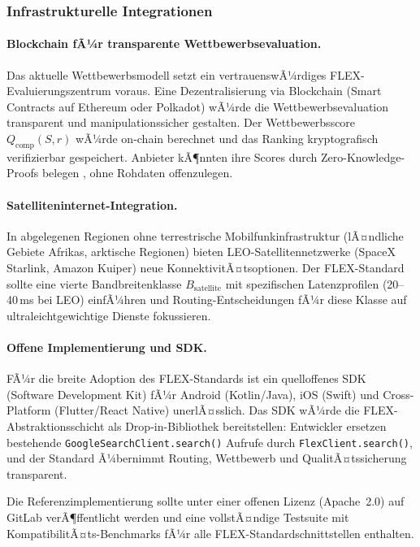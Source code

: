 ﻿\documentclass[a4paper,12pt]{article}
\theoremstyle{definition}
\begin{document}
\subsubsection{Infrastrukturelle Integrationen}

\paragraph{Blockchain fÃ¼r transparente Wettbewerbsevaluation.}
Das aktuelle Wettbewerbsmodell setzt ein vertrauenswÃ¼rdiges FLEX-Evaluierungszentrum voraus. Eine Dezentralisierung via Blockchain (Smart Contracts auf Ethereum oder Polkadot) wÃ¼rde die Wettbewerbsevaluation transparent und manipulationssicher gestalten. Der Wettbewerbsscore $Q_\mathrm{comp}(S, r)$ wÃ¼rde on-chain berechnet und das Ranking kryptografisch verifizierbar gespeichert. Anbieter kÃ¶nnten ihre Scores durch Zero-Knowledge-Proofs belegen \cite{boneh2023}, ohne Rohdaten offenzulegen.

\paragraph{Satelliteninternet-Integration.}
In abgelegenen Regionen ohne terrestrische Mobilfunkinfrastruktur (lÃ¤ndliche Gebiete Afrikas, arktische Regionen) bieten LEO-Satellitennetzwerke (SpaceX Starlink, Amazon Kuiper) neue KonnektivitÃ¤tsoptionen. Der FLEX-Standard sollte eine vierte Bandbreitenklasse $B_\mathrm{satellite}$ mit spezifischen Latenzprofilen (20--40\,ms bei LEO) einfÃ¼hren und Routing-Entscheidungen fÃ¼r diese Klasse auf ultraleichtgewichtige Dienste fokussieren.

\paragraph{Offene Implementierung und SDK.}
FÃ¼r die breite Adoption des FLEX-Standards ist ein quelloffenes SDK (Software Development Kit) fÃ¼r Android (Kotlin/Java), iOS (Swift) und Cross-Platform (Flutter/React Native) unerlÃ¤sslich. Das SDK wÃ¼rde die FLEX-Abstraktionsschicht als Drop-in-Bibliothek bereitstellen: Entwickler ersetzen bestehende \texttt{GoogleSearchClient.search()} Aufrufe durch \texttt{FlexClient.search()}, und der Standard Ã¼bernimmt Routing, Wettbewerb und QualitÃ¤tssicherung transparent.

Die Referenzimplementierung sollte unter einer offenen Lizenz (Apache~2.0) auf GitLab verÃ¶ffentlicht werden und eine vollstÃ¤ndige Testsuite mit KompatibilitÃ¤ts-Benchmarks fÃ¼r alle FLEX-Standardschnittstellen enthalten.
\end{document}
